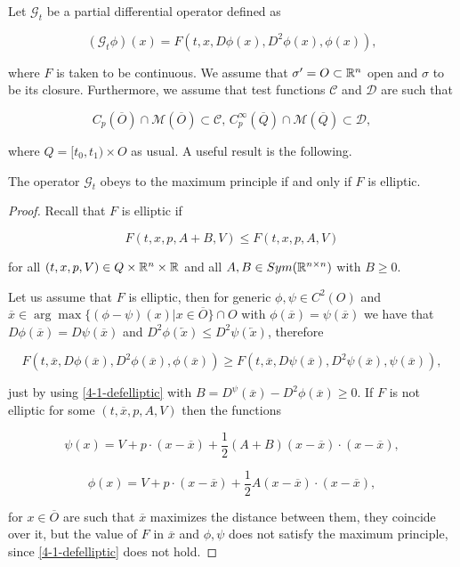 Let $\mathcal{G}_t$ be a partial differential operator defined as

\begin{equation}\label{4-1-GPDEop}
    (\mathcal{G}_t\phi)(x) = F(t,x,D\phi(x), D^2\phi(x), \phi(x)),
\end{equation}

where $F$ is taken to be continuous. We assume that $\sigma'=O\subset\mathbb{R}^n$ open and $\sigma$ to be its closure. 
Furthermore, we assume that test functions $\mathcal{C}$ and $\mathcal{D}$ are such that

\begin{equation}\label{4-1-condonCandD}
    C_p(\overline{O})\cap\mathcal{M}(\overline{O}) \subset \mathcal{C},\,C_p^{\infty}(\overline{Q})\cap\mathcal{M}(\overline{Q}) \subset \mathcal{D},
\end{equation}

where $Q=[t_0,t_1)\times O$ as usual. A useful result is the following.

\begin{lemma}
    The operator $\mathcal{G}_t$ obeys to the maximum principle if and only if $F$ is elliptic.

    \begin{proof}
        Recall that $F$ is elliptic if

        \begin{equation}\label{4-1-defelliptic}
            F(t,x,p,A+B,V) \leq F(t,x,p,A,V)
        \end{equation}

        for all $(t,x,p,V)\in Q\times\mathbb{R}^n\times\mathbb{R}$ and all $A,B\in Sym(\mathbb{R}^{n\times n})$ with $B\geq0$.

        Let us assume that $F$ is elliptic, then for generic $\phi,\psi\in C^2(O)$ and $\overline{x}\in\arg \max\{(\phi-\psi)(x)|x\in\overline{O}\}\cap O$ 
        with $\phi(\overline{x})=\psi(\overline{x})$ we have that $D\phi(\overline{x})=D\psi(\overline{x})$ and $D^2\phi(\overleftarrow{x})\leq D^2\psi(\overleftarrow{x})$, 
        therefore

        \[F(t,\overline{x}, D\phi(\overline{x}), D^2\phi(\overline{x}),\phi(\overline{x}))\geq F(t,\overline{x}, D\psi(\overline{x}), D^2\psi(\overline{x}),\psi(\overline{x})),\]

        just by using \ref{4-1-defelliptic} with $B=D^\psi(\overline{x})-D^2\phi(\overline{x})\geq0$. If $F$ is not elliptic 
        for some $(t,\overline{x},p,A,V)$ then the functions

        \[\psi(x) = V+p\cdot(x-\overline{x}) + \frac{1}{2}(A+B)(x-\overline{x})\cdot(x-\overline{x}),\]

        \[\phi(x) = V+p\cdot(x-\overline{x}) + \frac{1}{2}A(x-\overline{x})\cdot(x-\overline{x}),\]

        for $x\in\overline{O}$ are such that $\overline{x}$ maximizes the distance between them, they coincide over it, but 
        the value of $F$ in $\overline{x}$ and $\phi,\psi$ does not satisfy the maximum principle, since \ref{4-1-defelliptic} 
        does not hold.
    \end{proof}
\end{lemma}


